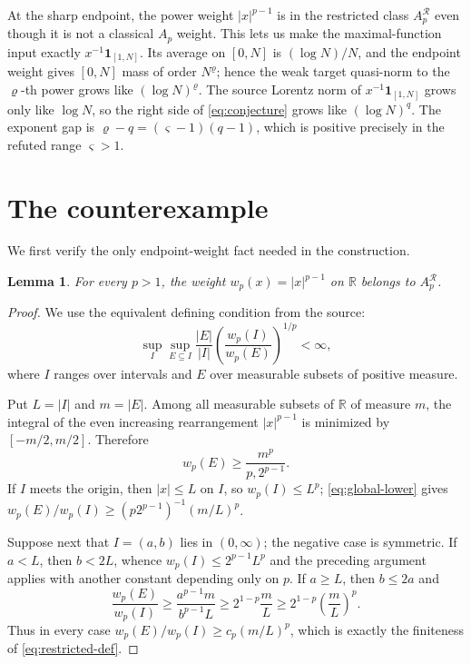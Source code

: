 \documentclass[11pt]{article}
\newtheorem{lemma}{Lemma}
\newcommand{\R}{\mathbb R}
\newcommand{\AR}{A^{\mathcal R}}
\begin{document}
At the sharp endpoint, the power weight $|x|^{p-1}$ is in the restricted
class $\AR_p$ even though it is not a classical $A_p$ weight.  This lets us
make the maximal-function input exactly $x^{-1}\mathbf1_{[1,N]}$.  Its
average on $[0,N]$ is $(\log N)/N$, and the endpoint weight gives
$[0,N]$ mass of order $N^\varrho$; hence the weak target quasi-norm to the
$\varrho$-th power grows like $(\log N)^\varrho$.  The source Lorentz norm
of $x^{-1}\mathbf1_{[1,N]}$ grows only like $\log N$, so the right side of
\eqref{eq:conjecture} grows like $(\log N)^q$.  The exponent gap is
\(\varrho-q=(\varsigma-1)(q-1)\), which is positive precisely in the
refuted range $\varsigma>1$.

\section{The counterexample}

We first verify the only endpoint-weight fact needed in the construction.

\begin{lemma}\label{lem:endpoint}
For every $p>1$, the weight $w_p(x)=|x|^{p-1}$ on $\R$ belongs to
$\AR_p$.
\end{lemma}

\begin{proof}
We use the equivalent defining condition from the source:
\begin{equation}\label{eq:restricted-def}
 \sup_I\sup_{E\subseteq I}
 \frac{|E|}{|I|}\left(\frac{w_p(I)}{w_p(E)}\right)^{1/p}<\infty,
\end{equation}
where $I$ ranges over intervals and $E$ over measurable subsets of positive
measure.

Put $L=|I|$ and $m=|E|$.  Among all measurable subsets of $\R$ of measure
$m$, the integral of the even increasing rearrangement $|x|^{p-1}$ is
minimized by $[-m/2,m/2]$.  Therefore
\begin{equation}\label{eq:global-lower}
 w_p(E)\geq \frac{m^p}{p,2^{p-1}}.
\end{equation}
If $I$ meets the origin, then $|x|\leq L$ on $I$, so $w_p(I)\leq L^p$;
\eqref{eq:global-lower} gives
$w_p(E)/w_p(I)\geq (p2^{p-1})^{-1}(m/L)^p$.

Suppose next that $I=(a,b)$ lies in $(0,\infty)$; the negative case is
symmetric.  If $a<L$, then $b<2L$, whence
$w_p(I)\leq2^{p-1}L^p$ and the preceding argument applies with another
constant depending only on $p$.  If $a\geq L$, then $b\leq2a$ and
\[
 \frac{w_p(E)}{w_p(I)}
 \geq \frac{a^{p-1}m}{b^{p-1}L}
 \geq 2^{1-p}\frac mL
 \geq 2^{1-p}\left(\frac mL\right)^p.
\]
Thus in every case $w_p(E)/w_p(I)\geq c_p(m/L)^p$, which is exactly the
finiteness of \eqref{eq:restricted-def}.
\end{proof}
\end{document}
